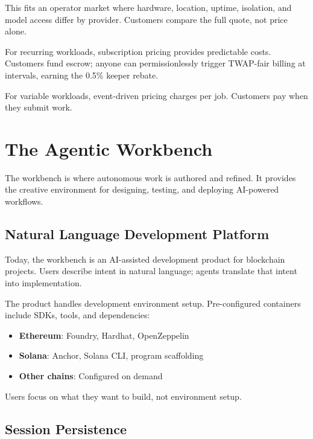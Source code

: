 \documentclass[11pt,a4paper]{article}
\begin{document}
This fits an operator market where hardware, location, uptime, isolation, and model access differ by provider. Customers compare the full quote, not price alone.

For recurring workloads, subscription pricing provides predictable costs. Customers fund escrow; anyone can permissionlessly trigger TWAP-fair billing at intervals, earning the 0.5\% keeper rebate.

For variable workloads, event-driven pricing charges per job. Customers pay when they submit work.

\section{The Agentic Workbench}

The workbench is where autonomous work is authored and refined. It provides the creative environment for designing, testing, and deploying AI-powered workflows.

\subsection{Natural Language Development Platform}

Today, the workbench is an AI-assisted development product for blockchain projects. Users describe intent in natural language; agents translate that intent into implementation.

The product handles development environment setup. Pre-configured containers include SDKs, tools, and dependencies:

\begin{itemize}[noitemsep]
    \item \textbf{Ethereum}: Foundry, Hardhat, OpenZeppelin
    \item \textbf{Solana}: Anchor, Solana CLI, program scaffolding
    \item \textbf{Other chains}: Configured on demand
\end{itemize}

Users focus on what they want to build, not environment setup.

\subsection{Session Persistence}
\end{document}
